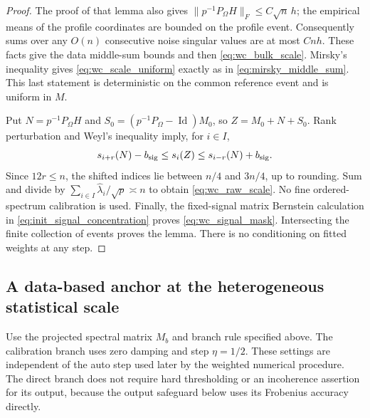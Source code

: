 \documentclass[numsec,webpdf,modern,large,namedate]{oup-authoring-template}
\theoremstyle{plain}
\theoremstyle{remark}
\newif\ifmarkchanges
\newenvironment{revision}{\begingroup\ifmarkchanges\color{red}\fi}{\endgroup}
\begin{document}
\begin{revision}
\begin{proof}
The proof of that lemma also gives
$\|p^{-1}P_\Omega H\|_F\le C\sqrt n\,h$; the empirical means of the
profile coordinates are bounded on the profile event. Consequently
sums over any $O(n)$ consecutive noise singular values are at most $Cnh$.
These facts give the data middle-sum bounds and then
\eqref{eq:wc_bulk_scale}. Mirsky's inequality gives
\eqref{eq:wc_scale_uniform} exactly as in
\eqref{eq:mirsky_middle_sum}. This last statement is deterministic on the
common reference event and is uniform in $M$.

Put $N=p^{-1}P_\Omega H$ and
$S_0=(p^{-1}P_\Omega-\operatorname{Id})M_0$, so
$Z=M_0+N+S_0$. Rank perturbation and Weyl's inequality imply, for $i\in I$,
\[
 s_{i+r}(N)-b_{\rm sig}\le s_i(Z)
                   \le s_{i-r}(N)+b_{\rm sig}.
\]
Since $12r\le n$, the shifted indices lie between $n/4$ and $3n/4$,
up to rounding. Sum and divide by
$\sum_{i\in I}\widehat\lambda_i/\sqrt p\asymp n$ to obtain
\eqref{eq:wc_raw_scale}. No fine ordered-spectrum calibration is used.
Finally, the fixed-signal matrix Bernstein calculation in
\eqref{eq:init_signal_concentration} proves \eqref{eq:wc_signal_mask}.
Intersecting the finite collection of events proves the lemma. There is
no conditioning on fitted weights at any step.
\end{proof}

\subsection{A data-based anchor at the heterogeneous statistical scale}
Use the projected spectral matrix $M_b$ and branch rule specified above. The calibration branch uses zero damping and step $\eta=1/2$.
These settings are independent of the auto step used later by the weighted
numerical procedure. The direct branch does not require hard thresholding
or an incoherence assertion for its output, because the output safeguard
below uses its Frobenius accuracy directly.


\end{revision}
\end{document}
